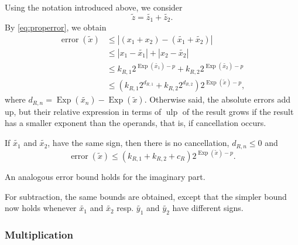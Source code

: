 \documentclass [12pt]{article}
\newcommand {\corr}[1]{{#1}}
\newcommand {\appro}[1]{\widetilde {#1}}
\newcommand {\Ulp}{{\operatorname {ulp}}}
\DeclareMathOperator{\Exp}{\operatorname {Exp}}
\newcommand{\error}{\operatorname {error}}
\renewcommand {\leq}{\leqslant}
\begin{document}
Using the notation introduced above, we consider
\[
\appro z = \appro {z_1} + \appro {z_2}.
\]
By \eqref {eq:properror}, we obtain
\begin{align*}
\error (\appro x)
& \leq | (\corr {x_1} + \corr {x_2}) - (\appro {x_1} + \appro {x_2})|
\\
& \leq | \corr {x_1} - \appro {x_1} | + | \corr {x_2} - \appro {x_2}|
\\
& \leq k_{R,1} 2^{\Exp (\appro {x_1}) - p}
+ k_{R,2} 2^{\Exp (\appro {x_2}) - p}
\\
& \leq \left( k_{R,1} 2^{d_{R,1}} + k_{R,2} 2^{d_{R,2}} \right)
2^{\Exp (\appro x) - p},
\end{align*}
where $d_{R,n}=\Exp(\appro {x_n})-\Exp(\appro x)$.
Otherwise said, the absolute errors add up, but their relative expression
in terms of $\Ulp$ of the result grows if the result has a smaller
exponent than the operands, that is, if cancellation occurs.

If $\appro {x_1}$ and $\appro {x_2}$, have the same sign, then there
is no cancellation, $d_{R, n} \leq 0$ and
\[
\error (\appro x) \leq (k_{R,1} + k_{R,2} + c_R) 2^{\Exp (\appro x) - p}.
\]

An analogous error bound holds for the imaginary part.

For subtraction, the same bounds are obtained, except that the simpler bound
now holds whenever $\appro {x_1}$ and $\appro {x_2}$ resp.
$\appro {y_1}$ and $\appro {y_2}$ have different signs.


\subsubsection {Multiplication}
\label {sssec:propmul}
\end{document}
